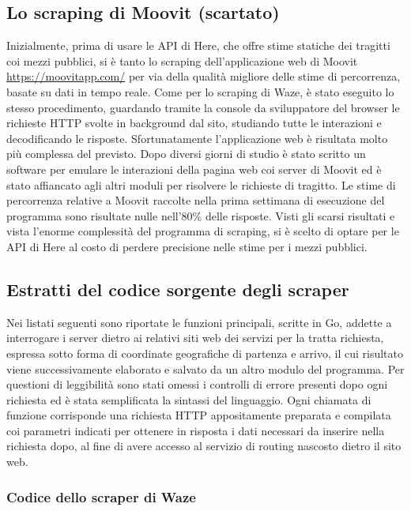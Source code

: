\subsection{Lo scraping di Moovit (scartato)}

Inizialmente, prima di usare le API di Here, che offre stime statiche dei tragitti coi mezzi pubblici, si è tanto lo scraping dell'applicazione web di Moovit \url{https://moovitapp.com/} per via della qualità migliore delle stime di percorrenza, basate su dati in tempo reale. Come per lo scraping di Waze, è stato eseguito lo stesso procedimento, guardando tramite la console da sviluppatore del browser le richieste HTTP svolte in background dal sito, studiando tutte le interazioni e decodificando le risposte. Sfortunatamente l'applicazione web è risultata molto più complessa del previsto. Dopo diversi giorni di studio è stato scritto un software per emulare le interazioni della pagina web coi server di Moovit ed è stato affiancato agli altri moduli per risolvere le richieste di tragitto. Le stime di percorrenza relative a Moovit raccolte nella prima settimana di esecuzione del programma sono risultate nulle nell'80\% delle risposte. Visti gli scarsi risultati e vista l'enorme complessità del programma di scraping, si è scelto di optare per le API di Here al costo di perdere precisione nelle stime per i mezzi pubblici.

\subsection{Estratti del codice sorgente degli scraper}

Nei listati seguenti sono riportate le funzioni principali, scritte in Go, addette a interrogare i server dietro ai relativi siti web dei servizi per la tratta richiesta, espressa sotto forma di coordinate geografiche di partenza e arrivo, il cui risultato viene successivamente elaborato e salvato da un altro modulo del programma. Per questioni di leggibilità sono stati omessi i controlli di errore presenti dopo ogni richiesta ed è stata semplificata la sintassi del linguaggio. Ogni chiamata di funzione corrisponde una richiesta HTTP appositamente preparata e compilata coi parametri indicati per ottenere in risposta i dati necessari da inserire nella richiesta dopo, al fine di avere accesso al servizio di routing nascosto dietro il sito web.

\subsubsection{Codice dello scraper di Waze}

